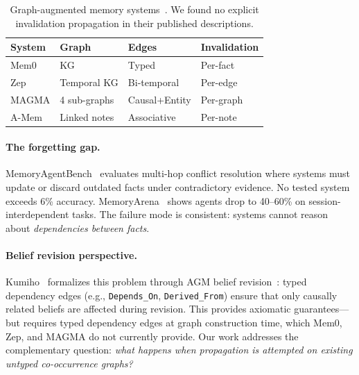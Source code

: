 \documentclass{article}
\begin{document}
\begin{table}[htbp]
\centering
\footnotesize
\begin{tabular}{llll}
\toprule
\textbf{System} & \textbf{Graph} & \textbf{Edges} & \textbf{Invalidation} \\
\midrule
Mem0 & KG & Typed & Per-fact \\
Zep & Temporal KG & Bi-temporal & Per-edge \\
MAGMA & 4 sub-graphs & Causal+Entity & Per-graph \\
A-Mem & Linked notes & Associative & Per-note \\
\bottomrule
\end{tabular}
\caption{Graph-augmented memory systems~\citep{mem0_2024, zep_2025, magma_2026, amem_2025}. We found no explicit invalidation propagation in their published descriptions.}
\label{tab:systems}
\end{table}

\paragraph{The forgetting gap.}
MemoryAgentBench~\citep{memoryagentbench_2026} evaluates multi-hop conflict resolution where systems must update or discard outdated facts under contradictory evidence.
No tested system exceeds 6\% accuracy.
MemoryArena~\citep{memoryarena_2026} shows agents drop to 40--60\% on session-interdependent tasks.
The failure mode is consistent: systems cannot reason about \textit{dependencies between facts}.

\paragraph{Belief revision perspective.}
Kumiho~\citep{kumiho_2026} formalizes this problem through AGM belief revision~\citep{agm_1985}: typed dependency edges (e.g., \texttt{Depends\_On}, \texttt{Derived\_From}) ensure that only causally related beliefs are affected during revision.
This provides axiomatic guarantees---but requires typed dependency edges at graph construction time, which Mem0, Zep, and MAGMA do not currently provide.
Our work addresses the complementary question: \textit{what happens when propagation is attempted on existing untyped co-occurrence graphs?}
\end{document}
